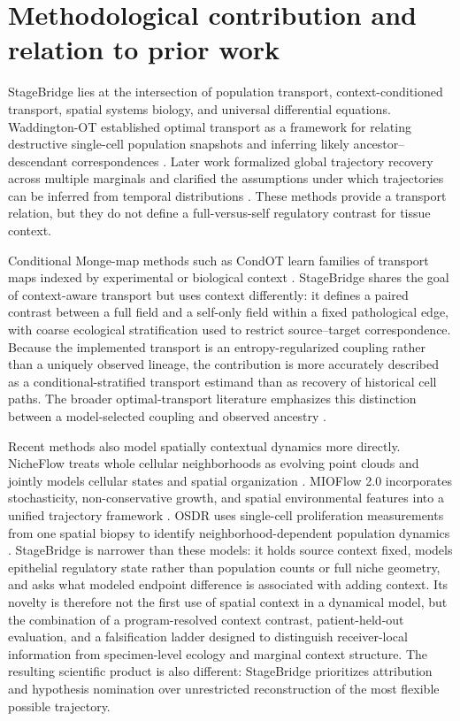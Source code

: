 \section{Methodological contribution and relation to prior work}
\label{sec:methodological-contribution}

StageBridge lies at the intersection of population transport, context-conditioned transport, spatial systems biology, and universal differential equations. Waddington-OT established optimal transport as a framework for relating destructive single-cell population snapshots and inferring likely ancestor--descendant correspondences \autocite{Schiebinger2019-lm}. Later work formalized global trajectory recovery across multiple marginals and clarified the assumptions under which trajectories can be inferred from temporal distributions \autocite{Lavenant2023-qv}. These methods provide a transport relation, but they do not define a full-versus-self regulatory contrast for tissue context.

Conditional Monge-map methods such as CondOT learn families of transport maps indexed by experimental or biological context \autocite{Bunne2022-go}. StageBridge shares the goal of context-aware transport but uses context differently: it defines a paired contrast between a full field and a self-only field within a fixed pathological edge, with coarse ecological stratification used to restrict source--target correspondence. Because the implemented transport is an entropy-regularized coupling rather than a uniquely observed lineage, the contribution is more accurately described as a conditional-stratified transport estimand than as recovery of historical cell paths. The broader optimal-transport literature emphasizes this distinction between a model-selected coupling and observed ancestry \autocite{Bunne2024-dv}.

Recent methods also model spatially contextual dynamics more directly. NicheFlow treats whole cellular neighborhoods as evolving point clouds and jointly models cellular states and spatial organization \autocite{Sakalyan2025-ia}. MIOFlow 2.0 incorporates stochasticity, non-conservative growth, and spatial environmental features into a unified trajectory framework \autocite{Sun2026-xk}. OSDR uses single-cell proliferation measurements from one spatial biopsy to identify neighborhood-dependent population dynamics \autocite{Somer2026-ma}. StageBridge is narrower than these models: it holds source context fixed, models epithelial regulatory state rather than population counts or full niche geometry, and asks what modeled endpoint difference is associated with adding context. Its novelty is therefore not the first use of spatial context in a dynamical model, but the combination of a program-resolved context contrast, patient-held-out evaluation, and a falsification ladder designed to distinguish receiver-local information from specimen-level ecology and marginal context structure. The resulting scientific product is also different: StageBridge prioritizes attribution and hypothesis nomination over unrestricted reconstruction of the most flexible possible trajectory.

